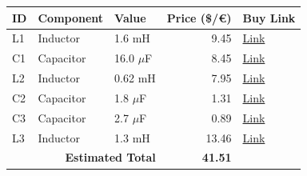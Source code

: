 \begin{table}[H]
    \centering
    \renewcommand{\arraystretch}{1.5}
    \begin{tabular}{@{}lllrl@{}}
        \toprule
        \textbf{ID} & \textbf{Component} & \textbf{Value} & \textbf{Price (\$/€)} & \textbf{Buy Link} \\
        \midrule
        L1 & Inductor & 1.6 mH & 9.45 & \href{https://www.soundimports.eu/en/jantzen-audio-000-2389.html}{Link} \\
        C1 & Capacitor & 16.0 $\mu$F & 8.45 & \href{https://www.soundimports.eu/en/jantzen-audio-001-0269.html}{Link} \\
        L2 & Inductor & 0.62 mH & 7.95 & \href{https://www.soundimports.eu/en/jantzen-audio-000-2347.html}{Link} \\
        C2 & Capacitor & 1.8 $\mu$F & 1.31 & \href{https://www.parts-express.com/Jantzen-0237-1.8uF-400V-Crosscap-Capacitor-027-914}{Link} \\
        C3 & Capacitor & 2.7 $\mu$F & 0.89 & \href{https://www.parts-express.com/2.7uF-100V-Non-Polarized-Capacitor-027-326}{Link} \\
        L3 & Inductor & 1.3 mH & 13.46 & \href{https://www.soundimports.eu/en/jantzen-audio-000-5005.html}{Link} \\
        \midrule
        \multicolumn{3}{r}{\textbf{Estimated Total}} & \textbf{41.51} & \\
        \bottomrule
    \end{tabular}
\end{table}
